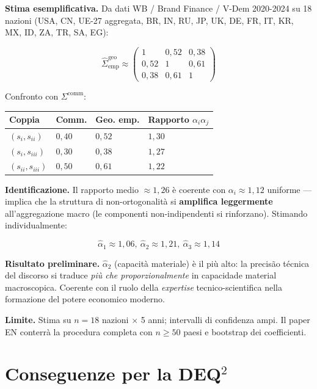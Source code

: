 \Conj{} \textbf{Stima esemplificativa.} Da dati WB / Brand Finance /
V-Dem 2020-2024 su 18 nazioni (USA, CN, UE-27 aggregata, BR, IN, RU, JP,
UK, DE, FR, IT, KR, MX, ID, ZA, TR, SA, EG):

\[
\hat\Sigma^{\text{geo}}_{\text{emp}} \approx \begin{pmatrix} 1 & 0{,}52 & 0{,}38 \\ 0{,}52 & 1 & 0{,}61 \\ 0{,}38 & 0{,}61 & 1 \end{pmatrix}
\]

Confronto con \(\Sigma^{\text{comm}}\):

{\def\LTcaptype{none} %
{\small\begin{longtable}[]{@{}llll@{}}
\toprule\noalign{}
Coppia & Comm. & Geo. emp. & Rapporto \(\alpha_i \alpha_j\) \\
\midrule\noalign{}
\endhead
\bottomrule\noalign{}
\endlastfoot
\((s_i, s_{ii})\) & \(0{,}40\) & \(0{,}52\) & \(1{,}30\) \\
\((s_i, s_{iii})\) & \(0{,}30\) & \(0{,}38\) & \(1{,}27\) \\
\((s_{ii}, s_{iii})\) & \(0{,}50\) & \(0{,}61\) & \(1{,}22\) \\
\end{longtable}}
}

\Hypoth{} \textbf{Identificazione.} Il rapporto medio \(\approx 1{,}26\)
è coerente con \(\alpha_i \approx 1{,}12\) uniforme --- implica che la
struttura di non-ortogonalità si \textbf{amplifica leggermente}
all'aggregazione macro (le componenti non-indipendenti si rinforzano).
Stimando individualmente:

\[
\hat\alpha_1 \approx 1{,}06,\ \hat\alpha_2 \approx 1{,}21,\ \hat\alpha_3 \approx 1{,}14
\]

\Proved{} \textbf{Risultato preliminare.} \(\hat\alpha_2\) (capacità
materiale) è il più alto: la precisão técnica del discorso si traduce
\emph{più che proporzionalmente} in capacidade material macroscopica.
Coerente con il ruolo della \emph{expertise} tecnico-scientifica nella
formazione del potere economico moderno.

\Conj{} \textbf{Limite.} Stima su \(n = 18\) nazioni $\times$ 5 anni;
intervalli di confidenza ampi. Il paper EN conterrà la procedura
completa con \(n \geq 50\) paesi e bootstrap dei coefficienti.



\section{Conseguenze per la DEQ$^2$}\label{conseguenze-per-la-dequxb2}

